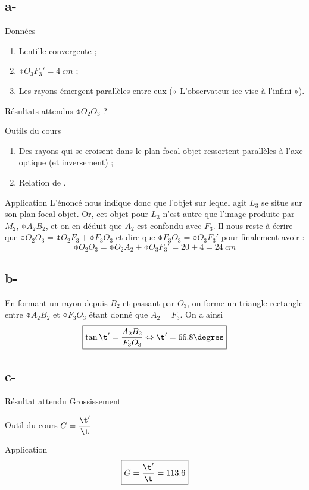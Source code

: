 \documentclass[10pt,a5paper,notitlepage]{book}
\begin{document}
\subsection{a-}
\begin{NCdefi}{Données}
    \begin{enumerate}
        \item Lentille convergente ;
        \item $\obar{O_3F_3'} = \SI{4}{cm}$ ;
        \item Les rayons émergent parallèles entre eux (« L'observateur-ice vise
            à l'infini »).
    \end{enumerate}
\end{NCdefi}

\begin{NCprop}{Résultats attendus}
    $\obar{O_2O_3}$ ?
\end{NCprop}

\begin{NCdemo}{Outils du cours}
    \begin{enumerate}

        \item Des rayons qui se croisent dans le plan focal objet ressortent
            parallèles à l'axe optique (et inversement) ;

        \item Relation de .
    \end{enumerate}
\end{NCdemo}

\begin{NCexem}{Application}
    L'énoncé nous indique donc que l'objet sur lequel agit $L_3$ se situe sur
    son plan focal objet. Or, cet objet pour $L_3$ n'est autre que l'image
    produite par $M_2$, $\obar{A_2B_2}$, et on en déduit que $A_2$ est confondu
    avec $F_3$. Il nous reste à écrire que $\obar{O_2O_3} = \obar{O_2F_3} +
    \obar{F_3O_3}$ et dire que $\obar{F_3O_3} = \obar{O_3F_3'}$ pour finalement
    avoir :
    \[ \boxed{\obar{O_2O_3} = \obar{O_2A_2} + \obar{O_3F_3'} = 20 + 4 =
    \SI{24}{cm}} \]
\end{NCexem}

\setcounter{subsection}{2}
\subsection{b-}
En formant un rayon depuis $B_2$ et passant par $O_3$, on forme un triangle
rectangle entre $\obar{A_2B_2}$ et $ \obar{F_3O_3}$ étant donné que $A_2 = F_3$.
On a ainsi \[ \boxed{\tan\t' = \frac{A_2B_2}{F_3O_3} \Leftrightarrow \t' =
66.8\degres}\]

\setcounter{subsection}{2}
\subsection{c-}
\begin{NCprop}{Résultat attendu}
    Grossissement
\end{NCprop}

\begin{NCdemo}{Outil du cours}
    $ \displaystyle G = \frac{\t'}{\t}$
\end{NCdemo}

\begin{NCexem}{Application}
    \[ \boxed{G = \frac{\t'}{\t} = 113.6} \]
\end{NCexem}
\end{document}
